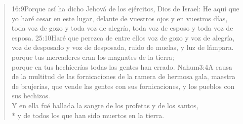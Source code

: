 \begin{verse}
					{16:9}{Porque así ha dicho Jehová de los ejércitos, Dios de Israel: He aquí que yo haré cesar en este lugar, delante de vuestros ojos y en vuestros días, toda voz de gozo y toda voz de alegría, toda voz de esposo y toda voz de esposa.}%
					{25:10}{Haré que perezca de entre ellos voz de gozo y voz de alegría, voz de desposado y voz de desposada, ruido de muelas, y luz de lámpara.}\\
 porque tus mercaderes eran los magnates de la tierra;%
	\\
 porque en tus hechicerías todas las gentes han errado.%
				{Nahum}{3:4}{A causa de la multitud de las fornicaciones de la ramera de hermosa gala, maestra de brujerías, que vende las gentes con sus fornicaciones, y los pueblos con sus hechizos.}\\
Y en ella fué hallada la sangre de los profetas y de los santos,\\*\vin
y de todos los que han sido muertos en la tierra.%
\end{verse}
